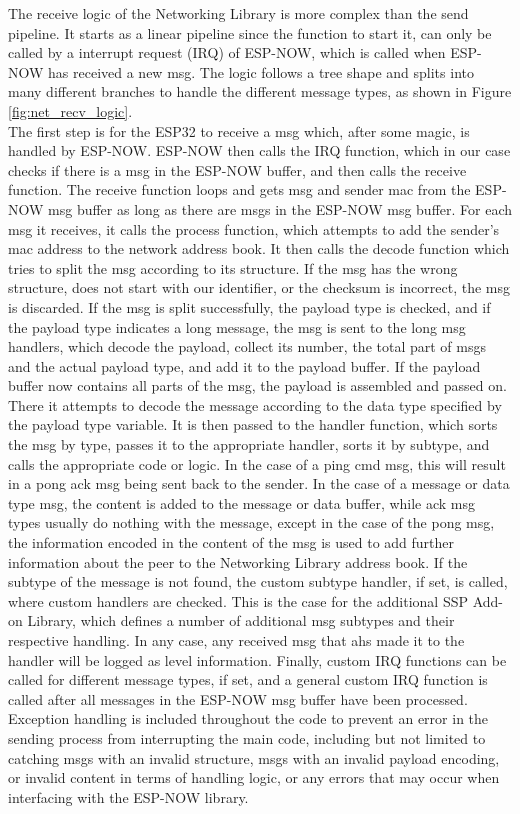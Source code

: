 The receive logic of the Networking Library is more complex than the send pipeline. It starts as a linear pipeline since the function to start it, can only be called by a interrupt request (IRQ) of ESP-NOW, which is called when ESP-NOW has received a new msg. The logic follows a tree shape and splits into many different branches to handle the different message types, as shown in Figure \ref{fig:net_recv_logic}. \\
The first step is for the ESP32 to receive a msg which, after some magic, is handled by ESP-NOW. ESP-NOW then calls the IRQ function, which in our case checks if there is a msg in the ESP-NOW buffer, and then calls the receive function. The receive function loops and gets msg and sender mac from the ESP-NOW msg buffer as long as there are msgs in the ESP-NOW msg buffer. For each msg it receives, it calls the process function, which attempts to add the sender's mac address to the network address book. It then calls the decode function which tries to split the msg according to its structure. If the msg has the wrong structure, does not start with our identifier, or the checksum is incorrect, the msg is discarded. If the msg is split successfully, the payload type is checked, and if the payload type indicates a long message, the msg is sent to the long msg handlers, which decode the payload, collect its number, the total part of msgs and the actual payload type, and add it to the payload buffer. If the payload buffer now contains all parts of the msg, the payload is assembled and passed on. There it attempts to decode the message according to the data type specified by the payload type variable. It is then passed to the handler function, which sorts the msg by type, passes it to the appropriate handler, sorts it by subtype, and calls the appropriate code or logic. In the case of a ping cmd msg, this will result in a pong ack msg being sent back to the sender. In the case of a message or data type msg, the content is added to the message or data buffer, while ack msg types usually do nothing with the message, except in the case of the pong msg, the information encoded in the content of the msg is used to add further information about the peer to the Networking Library address book. If the subtype of the message is not found, the custom subtype handler, if set, is called, where custom handlers are checked. This is the case for the additional SSP Add-on Library, which defines a number of additional msg subtypes and their respective handling. In any case, any received msg that ahs made it to the handler will be logged as level information. Finally, custom IRQ functions can be called for different message types, if set, and a general custom IRQ function is called after all messages in the ESP-NOW msg buffer have been processed. \\
Exception handling is included throughout the code to prevent an error in the sending process from interrupting the main code, including but not limited to catching msgs with an invalid structure, msgs with an invalid payload encoding, or invalid content in terms of handling logic, or any errors that may occur when interfacing with the ESP-NOW library.

